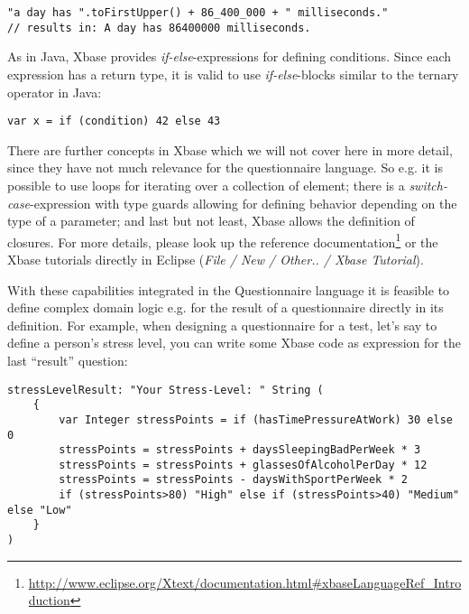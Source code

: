\begin{lstlisting}[language=Xbase]
"a day has ".toFirstUpper() + 86_400_000 + " milliseconds."
// results in: A day has 86400000 milliseconds.
\end{lstlisting}

As in Java, Xbase provides \emph{if-else}-expressions for defining conditions. Since each expression
has a return type, it is valid to use  \emph{if-else}-blocks similar to the ternary operator in Java:

\begin{lstlisting}[language=Xbase]
var x = if (condition) 42 else 43
\end{lstlisting}

There are further concepts in Xbase which we will not cover here in more detail, since they have
not much relevance for the questionnaire language. So e.g. it is possible to use loops for
iterating over a collection of element; there is a \emph{switch-case}-expression
with type guards allowing for defining behavior depending on the type of a parameter; and last but
not least, Xbase allows the definition of closures. For more details, please look up the reference
documentation\footnote{\url{http://www.eclipse.org/Xtext/documentation.html#xbaseLanguageRef_Introduction}}
or the Xbase tutorials directly in Eclipse (\emph{File / New / Other.. / Xbase Tutorial}). 

With these capabilities integrated in the Questionnaire language it is feasible to define complex
domain logic e.g. for the result of a questionnaire directly in its definition. For example, when
designing a questionnaire for a test, let's say to define a person's stress level, you can write
some Xbase code as expression for the last ``result'' question:

\begin{lstlisting}[language=Xbase]
stressLevelResult: "Your Stress-Level: " String (
	{
		var Integer stressPoints = if (hasTimePressureAtWork) 30 else 0
		stressPoints = stressPoints + daysSleepingBadPerWeek * 3
		stressPoints = stressPoints + glassesOfAlcoholPerDay * 12
		stressPoints = stressPoints - daysWithSportPerWeek * 2
		if (stressPoints>80) "High" else if (stressPoints>40) "Medium" else "Low"
	}
) 
\end{lstlisting}
